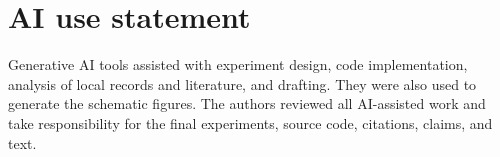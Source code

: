 \documentclass{article}
\begin{document}
\section*{AI use statement}
Generative AI tools assisted with experiment design, code implementation,
analysis of local records and literature, and drafting. They were also used
to generate the schematic figures. The authors reviewed all
AI-assisted work and take responsibility for the final experiments, source
code, citations, claims, and text.



\clearpage
\appendix

\end{document}
